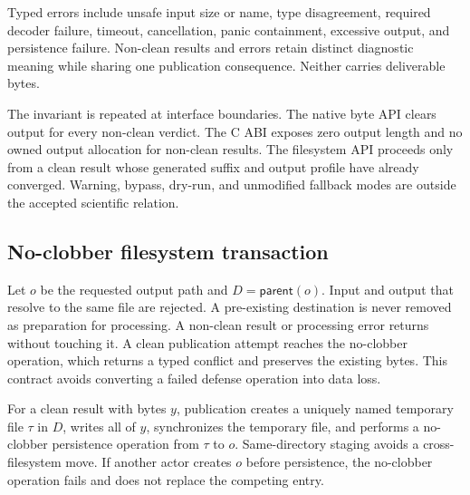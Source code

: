 Typed errors include unsafe input size or name, type disagreement, required
decoder failure, timeout, cancellation, panic containment, excessive output,
and persistence failure. Non-clean results and errors retain distinct diagnostic
meaning while sharing one publication consequence. Neither carries deliverable
bytes.

The invariant is repeated at interface boundaries. The native byte API clears
output for every non-clean verdict. The C ABI exposes zero output length and no
owned output allocation for non-clean results. The filesystem API proceeds only
from a clean result whose generated suffix and output profile have already
converged. Warning, bypass, dry-run, and unmodified fallback modes are outside
the accepted scientific relation.

\subsection{No-clobber filesystem transaction}

Let $o$ be the requested output path and $D=\mathsf{parent}(o)$. Input and output
that resolve to the same file are rejected. A pre-existing destination is never
removed as preparation for processing. A non-clean result or processing error
returns without touching it. A clean publication attempt reaches the
no-clobber operation, which returns a typed conflict and preserves the existing
bytes. This contract avoids converting a failed defense operation into data
loss.

For a clean result with bytes $y$, publication creates a uniquely named
temporary file $\tau$ in $D$, writes all of $y$, synchronizes the temporary
file, and performs a no-clobber persistence operation from $\tau$ to $o$.
Same-directory staging avoids a cross-filesystem move. If another actor creates
$o$ before persistence, the no-clobber operation fails and does not replace the
competing entry.

